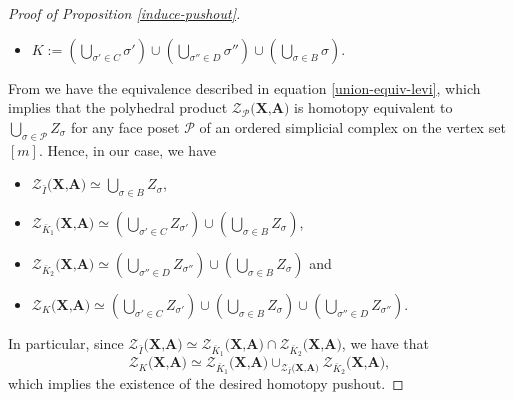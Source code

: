 \documentclass[a4paper,11pt]{article}
\theoremstyle{definition}
\newcommand{\PP}{\mathcal{P}}
\newcommand{\ZZ}{\mathcal{Z}}
\begin{document}
\begin{proof}[Proof of Proposition \ref{induce-pushout}]
\begin{itemize}
		\item $K := (\bigcup_{\sigma' \in C} \sigma') \cup (\bigcup_{\sigma'' \in D} \sigma'') \cup (\bigcup_{\sigma \in B} \sigma)$.
	\end{itemize}
	From \cite[Proposition~5.6]{kishimoto2019polyhedral} we have the equivalence described in equation \ref{union-equiv-levi}, which implies that the polyhedral product $\ZZ_\PP\textbf{(X,A)}$ is homotopy equivalent to $\bigcup_{\sigma \in \PP} Z_\sigma$ for any face poset $\PP$ of an ordered simplicial complex on the vertex set $[m]$.  Hence, in our case, we have 
	\begin{itemize}
		\item $\ZZ_{\bar I}\textbf{(X,A)} \simeq \bigcup_{\sigma \in B} Z_\sigma$,
		\item $\ZZ_{\bar K_1}\textbf{(X,A)} \simeq (\bigcup_{\sigma' \in C} Z_{\sigma'}) \cup (\bigcup_{\sigma \in B} Z_\sigma)$,
		\item $\ZZ_{\bar K_2}\textbf{(X,A)} \simeq (\bigcup_{\sigma'' \in D} Z_{\sigma''}) \cup (\bigcup_{\sigma \in B} Z_\sigma)$ and 
		\item $\ZZ_K\textbf{(X,A)} \simeq (\bigcup_{\sigma' \in C} Z_{\sigma'}) \cup (\bigcup_{\sigma \in B} Z_\sigma) \cup (\bigcup_{\sigma'' \in D} Z_{\sigma''})$.
	\end{itemize}
	In particular, since $\ZZ_{\bar I}\textbf{(X,A)} \simeq \ZZ_{\bar K_1}\textbf{(X,A)} \cap \ZZ_{\bar K_2}\textbf{(X,A)}$, we have that 
	\[\ZZ_{K}\textbf{(X,A)} \simeq \ZZ_{\bar K_1}\textbf{(X,A)} \cup_{\ZZ_{\bar I}\textbf{(X,A)}} \ZZ_{\bar K_2}\textbf{(X,A)},\] which implies the existence of the desired homotopy pushout. 
\end{proof}
\end{document}
